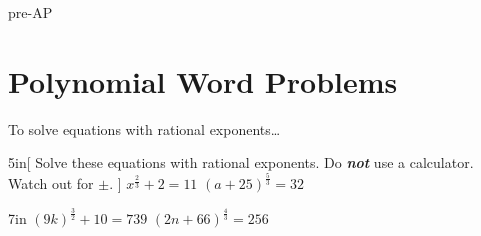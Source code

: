 \begin{taggedblock}{pre-AP}



\section{Polynomial Word Problems}

\begin{myConceptSteps}{To solve equations with rational exponents\dots}
\end{myConceptSteps}




\begin{my2Problems}[\large]{5in}[
        Solve these equations with rational exponents.
        Do {\bfseries\itshape not} use a calculator.
        Watch out for {\Large$\pm$}.
        ]
    {
        $ x^{\frac{2}{3}} + 2 = 11 $
    }
    {
        $ (a+25)^{\frac{5}{3}} = 32 $
    }
\end{my2Problems}
\begin{my2Problems}[\large]{7in}
    {
        $ (9k)^{\frac{3}{2}} + 10 = 739 $
    }
    {
        $ (2n + 66)^{\frac{4}{3}} = 256 $
    }
\end{my2Problems}


\end{taggedblock}
